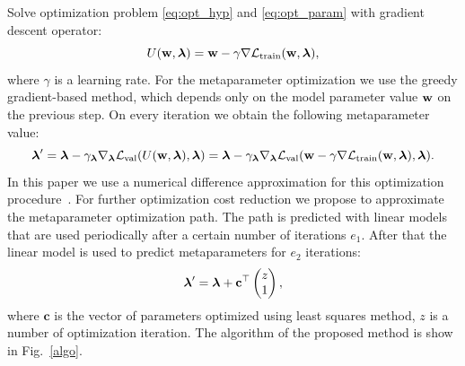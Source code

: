 \documentclass[runningheads]{llncs}
\begin{document}
Solve optimization problem \eqref{eq:opt_hyp} and \eqref{eq:opt_param} with gradient descent operator:
$$
    U(\mathbf{w}, \boldsymbol{\lambda}) = \mathbf{w} - \gamma\nabla\mathcal{L}_\text{train}(\mathbf{w}, \boldsymbol{\lambda}),
$$
where $\gamma$ is a learning rate. For the metaparameter optimization we use the greedy gradient-based method, which depends only on the model parameter value $\mathbf{w}$ on the previous step. On every iteration we obtain the following metaparameter value:
\begin{equation}
    \boldsymbol{\lambda}^\prime = \boldsymbol{\lambda} - \gamma_{\boldsymbol{\lambda}}\nabla_{\boldsymbol{\lambda}}\mathcal{L}_\text{val}(U(\mathbf{w}, \boldsymbol{\lambda}), \boldsymbol{\lambda}) = \boldsymbol{\lambda}\\ - \gamma_{\boldsymbol{\lambda}}\nabla_{\boldsymbol{\lambda}}\mathcal{L}_\text{val}(\mathbf{w} - \gamma\nabla\mathcal{L}_\text{train}(\mathbf{w}, \boldsymbol{\lambda}), \boldsymbol{\lambda}).
    \label{eq:hyp_alg}
\end{equation}
In this paper we use a numerical difference approximation for this optimization procedure~\cite{liu2018darts}. For further optimization cost reduction we propose to approximate the metaparameter optimization path. The path is predicted with linear models that are used periodically after a certain number of iterations  $e_1$. After that the linear model is used to predict metaparameters for $e_2$ iterations:
\begin{equation}
     \boldsymbol{\lambda}^\prime = 
     \boldsymbol{\lambda} + \mathbf{c}^{\top}\begin{pmatrix}z\\1\end{pmatrix},
     \label{eq:linear}
\end{equation}
where $\mathbf{c}$ is the vector of parameters optimized using least squares method, $z$ is a number of optimization iteration. The algorithm of the proposed method is show in Fig.~\ref{algo}.
\end{document}
